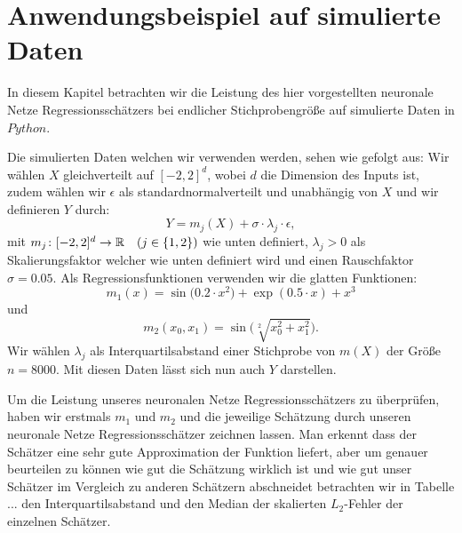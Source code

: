 \chapter{Anwendungsbeispiel auf simulierte Daten}
\label{chap:4}

In diesem Kapitel betrachten wir die Leistung des hier vorgestellten neuronale Netze Regressionsschätzers bei endlicher Stichprobengröße auf simulierte Daten in $Python$.

Die simulierten Daten welchen wir verwenden werden, sehen wie gefolgt aus:
Wir wählen $X$ gleichverteilt auf $[-2, 2]^d$, wobei $d$ die Dimension des Inputs ist, zudem wählen wir $\epsilon$ als standardnormalverteilt und unabhängig von $X$ und wir definieren $Y$ durch:
$$Y = m_j(X) + \sigma \cdot \lambda_j \cdot \epsilon,$$ 
mit $m_j \colon [-2, 2]^d \to \mathbb{R} \quad (j \in \{1, 2\})$ wie unten definiert, $\lambda_j > 0$ als Skalierungsfaktor welcher wie unten definiert wird und einen Rauschfaktor $\sigma = 0.05.$ Als Regressionsfunktionen verwenden wir die glatten Funktionen:
$$ m_1(x) =  \sin\big(0.2 \cdot x^2\big) + \exp(0.5 \cdot x) + x^3$$
und
$$ m_2(x_0, x_1) = \sin\big(\sqrt[2]{x_0^2 + x_1^2}\big).$$
Wir wählen $\lambda_j$ als Interquartilsabstand einer Stichprobe von $m(X)$ der Größe $n = 8000$. Mit diesen Daten lässt sich nun auch $Y$ darstellen.

Um die Leistung unseres neuronalen Netze Regressionsschätzers zu überprüfen, haben wir erstmals $m_1$ und $m_2$ und die jeweilige Schätzung durch unseren neuronale Netze Regressionsschätzer zeichnen lassen. 
Man erkennt dass der Schätzer eine sehr gute Approximation der Funktion liefert, aber um genauer beurteilen zu können wie gut die Schätzung wirklich ist und wie gut unser Schätzer im Vergleich zu anderen Schätzern abschneidet betrachten wir in Tabelle ... den Interquartilsabstand und den Median der skalierten $L_2$-Fehler der einzelnen Schätzer. 

